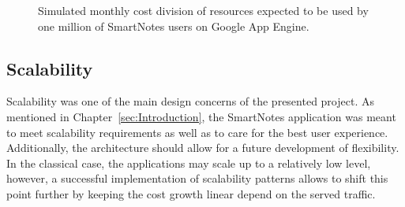\begin{figure}[ht]
  \begin{center}
  \end{center}
  \caption{Simulated monthly cost division of resources expected to be used by one million of SmartNotes users on Google App Engine.}
  \label{fig:gae_cost}
\end{figure}
 
\subsection{Scalability}\label{subsec:scalability_on_gae}
Scalability was one of the main design concerns of the presented project. As mentioned in Chapter~\ref{sec:Introduction}, the SmartNotes application was meant to meet scalability requirements as well as to care for the best user experience. Additionally, the architecture should allow for a future development of flexibility. In the classical case, the applications may scale up to a relatively low level, however, a successful implementation of scalability patterns allows to shift this point further by keeping the cost growth linear depend on the served traffic. 
 
